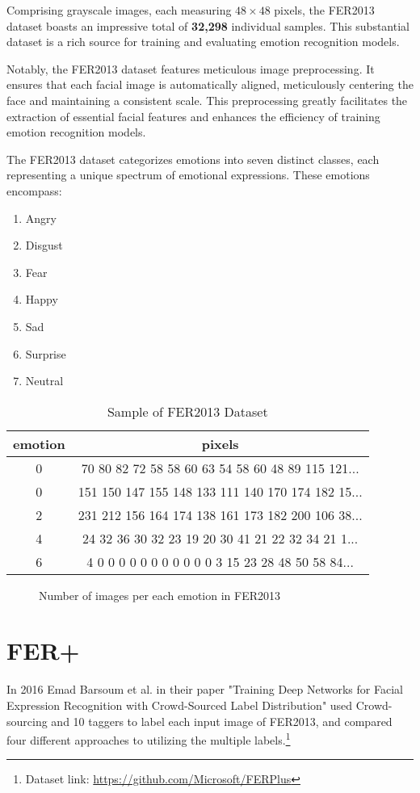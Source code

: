 \documentclass[]{report}
\begin{document}
Comprising grayscale images, each measuring $48 \times 48$ pixels, the FER2013 dataset boasts an impressive total of \textbf{32,298} individual samples. This substantial dataset is a rich source for training and evaluating emotion recognition models.

Notably, the FER2013 dataset features meticulous image preprocessing. It ensures that each facial image is automatically aligned, meticulously centering the face and maintaining a consistent scale. This preprocessing greatly facilitates the extraction of essential facial features and enhances the efficiency of training emotion recognition models.

The FER2013 dataset categorizes emotions into seven distinct classes, each representing a unique spectrum of emotional expressions. These emotions encompass:


\begin{enumerate}
	\item Angry
	\item Disgust
	\item Fear
	\item Happy
	\item Sad
	\item Surprise
	\item Neutral
\end{enumerate}

\begin{table}
	\centering
	\caption{Sample of FER2013 Dataset}
	\begin{tabular}{| c | c |}
		
		\hline
		emotion &	pixels \\
		\hline
		0 &	70 80 82 72 58 58 60 63 54 58 60 48 89 115 121... \\ \hline
		0 &	151 150 147 155 148 133 111 140 170 174 182 15... \\ \hline
		2 &	231 212 156 164 174 138 161 173 182 200 106 38... \\ \hline
		4 &	24 32 36 30 32 23 19 20 30 41 21 22 32 34 21 1... \\ \hline
		6 &	4 0 0 0 0 0 0 0 0 0 0 0 3 15 23 28 48 50 58 84... \\ \hline
	\end{tabular}
\end{table}
\begin{figure}
	\centering
	
	\caption{Number of images per each emotion in FER2013}
\end{figure}
\section{FER+}
In 2016 Emad Barsoum et al. in their paper "Training Deep Networks for Facial Expression Recognition with Crowd-Sourced Label Distribution"\cite{barsoum2016training} used Crowd-sourcing and 10 taggers to label each input image of FER2013, and compared four different approaches to utilizing the multiple labels.\footnote{Dataset link: \href{https://github.com/Microsoft/FERPlus}{https://github.com/Microsoft/FERPlus}}
\end{document}
